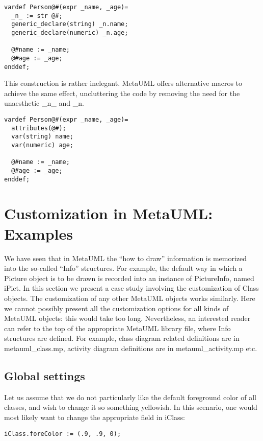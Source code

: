 \documentclass{article}
\newcommand{\code}{\ttfamily}
\begin{document}
\begin{verbatim}
vardef Person@#(expr _name, _age)=
  _n_ := str @#;
  generic_declare(string) _n.name;
  generic_declare(numeric) _n.age;

  @#name := _name;
  @#age := _age;
enddef;
\end{verbatim}

This construction is rather inelegant. MetaUML offers alternative macros to achieve
the same effect, uncluttering the code by removing the need for the unaesthetic {\code \_n\_} and
{\code \_n}.

\begin{verbatim}
vardef Person@#(expr _name, _age)=
  attributes(@#);
  var(string) name;
  var(numeric) age;

  @#name := _name;
  @#age := _age;
enddef;
\end{verbatim}

\section{Customization in MetaUML: Examples}
\label{section:customization}

We have seen that in MetaUML the ``how to draw'' information is memorized into the so-called
``{\code Info}'' structures. For example, the default way in which a {\code Picture} object is
to be drawn is recorded into an instance of {\code PictureInfo}, named {\code iPict}. In this section we
present a case study involving the customization of {\code Class} objects. The customization of
any other MetaUML objects works similarly. Here we cannot possibly present all the customization
options for all kinds of MetaUML objects: this would take too long. Nevertheless, an interested reader can refer
to the top of the appropriate MetaUML library file, where {\code Info} structures are defined.
For example, class diagram related definitions are in {\code metauml\_class.mp}, activity diagram
definitions are in {\code metauml\_activity.mp} etc.

\subsection{Global settings}

Let us assume that we do not particularly like the default foreground color of all classes, and wish
to change it so something yellowish. In this scenario, one would most likely want to change
the appropriate field in {\code iClass}:

\begin{verbatim}
iClass.foreColor := (.9, .9, 0);
\end{verbatim}
\end{document}
